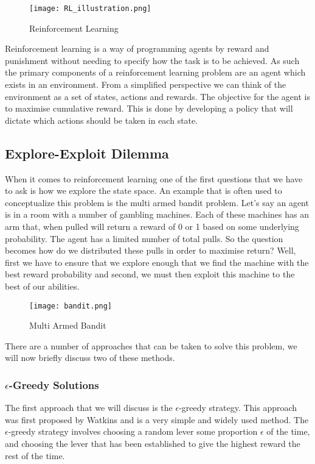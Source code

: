 \begin{figure}[ht]
    \texttt{[image: RL\_illustration.png]}
    \caption{Reinforcement Learning}
\end{figure}

Reinforcement learning is a way of programming agents by reward and punishment without needing to specify how the
task is to be achieved\citep{kaelbling1996reinforcement}.
As such the primary components of a reinforcement learning problem are an agent which exists in an environment.
From a simplified perspective we can think of the environment as a set of states, actions and rewards.
The objective for the agent is to maximise cumulative reward.
This is done by developing a policy that will dictate which actions should be taken in each state.

\subsection{Explore-Exploit Dilemma}\label{subsec:exploreExploit}
When it comes to reinforcement learning one of the first questions that we have to ask is how we explore
the state space.
An example that is often used to conceptualize this problem is the multi armed bandit problem.
Let's say an agent is in a room with a number of gambling machines.
Each of these machines has an arm that, when pulled will return a reward of 0 or 1 based on some underlying
probability\citep{kaelbling1996reinforcement}.
The agent has a limited number of total pulls.
So the question becomes how do we distributed these pulls in order to maximise return?
Well, first we have to ensure that we explore enough that we find the machine with the best reward probability
and second, we must then exploit this machine to the best of our abilities.

\begin{figure}[ht]
    \texttt{[image: bandit.png]}
    \caption{Multi Armed Bandit}
\end{figure}

There are a number of approaches that can be taken to solve this problem, we will now briefly discuss two of these
methods.

\subsubsection{$\epsilon$-Greedy Solutions}\label{subsec:eGreedy}
The first approach that we will discuss is the $\epsilon$-greedy strategy.
This approach was first proposed by Watkins\citep{watkins1989learning} and is a very simple and widely used method.
The $\epsilon$-greedy strategy involves choosing a random lever some proportion $\epsilon$ of the time, and
choosing the lever that has been established to give the highest reward the rest of the time.

